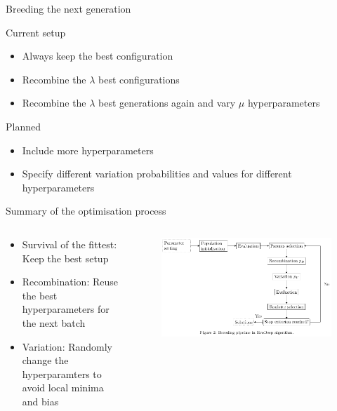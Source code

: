\begin{frame}{Breeding the next generation}
    \begin{block}{Current setup}
        \begin{itemize}
            \item Always keep the best configuration
            \item Recombine the $\lambda$ best configurations
            \item Recombine the $\lambda$ best generations again and vary $\mu$ hyperparameters
        \end{itemize}
    \end{block}
    \begin{block}{Planned}
        \begin{itemize}
            \item Include more hyperparameters
            \item Specify different variation probabilities and values for different hyperparameters
        \end{itemize}
    \end{block}
\end{frame}

\begin{frame}{Summary of the optimisation process}
    \begin{columns}
    \begin{column}{0.5\textwidth}
        \begin{itemize}
            \item Survival of the fittest: Keep the best setup
            \item Recombination: Reuse the best hyperparameters for the next batch
            \item Variation: Randomly change the hyperparamters to avoid local minima and bias
        \end{itemize}
    \end{column}
    \begin{column}{0.5\textwidth}
        \begin{figure}
            \centering
            \includegraphics[width=\textwidth]{breed.png}
            \caption{\cite{naranjo}}
        \end{figure}
    \end{column}
    \end{columns}
\end{frame}